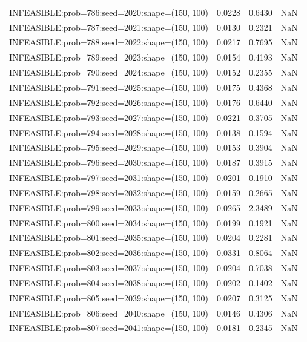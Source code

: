 \begin{longtable}{lccc}
INFEASIBLE:prob=786:seed=2020:shape=(150, 100) &   0.0228 &  0.6430 &    NaN \\
INFEASIBLE:prob=787:seed=2021:shape=(150, 100) &   0.0130 &  0.2321 &    NaN \\
INFEASIBLE:prob=788:seed=2022:shape=(150, 100) &   0.0217 &  0.7695 &    NaN \\
INFEASIBLE:prob=789:seed=2023:shape=(150, 100) &   0.0154 &  0.4193 &    NaN \\
INFEASIBLE:prob=790:seed=2024:shape=(150, 100) &   0.0152 &  0.2355 &    NaN \\
INFEASIBLE:prob=791:seed=2025:shape=(150, 100) &   0.0175 &  0.4368 &    NaN \\
INFEASIBLE:prob=792:seed=2026:shape=(150, 100) &   0.0176 &  0.6440 &    NaN \\
INFEASIBLE:prob=793:seed=2027:shape=(150, 100) &   0.0221 &  0.3705 &    NaN \\
INFEASIBLE:prob=794:seed=2028:shape=(150, 100) &   0.0138 &  0.1594 &    NaN \\
INFEASIBLE:prob=795:seed=2029:shape=(150, 100) &   0.0153 &  0.3904 &    NaN \\
INFEASIBLE:prob=796:seed=2030:shape=(150, 100) &   0.0187 &  0.3915 &    NaN \\
INFEASIBLE:prob=797:seed=2031:shape=(150, 100) &   0.0201 &  0.1910 &    NaN \\
INFEASIBLE:prob=798:seed=2032:shape=(150, 100) &   0.0159 &  0.2665 &    NaN \\
INFEASIBLE:prob=799:seed=2033:shape=(150, 100) &   0.0265 &  2.3489 &    NaN \\
INFEASIBLE:prob=800:seed=2034:shape=(150, 100) &   0.0199 &  0.1921 &    NaN \\
INFEASIBLE:prob=801:seed=2035:shape=(150, 100) &   0.0204 &  0.2281 &    NaN \\
INFEASIBLE:prob=802:seed=2036:shape=(150, 100) &   0.0331 &  0.8064 &    NaN \\
INFEASIBLE:prob=803:seed=2037:shape=(150, 100) &   0.0204 &  0.7038 &    NaN \\
INFEASIBLE:prob=804:seed=2038:shape=(150, 100) &   0.0202 &  0.1402 &    NaN \\
INFEASIBLE:prob=805:seed=2039:shape=(150, 100) &   0.0207 &  0.3125 &    NaN \\
INFEASIBLE:prob=806:seed=2040:shape=(150, 100) &   0.0146 &  0.4306 &    NaN \\
INFEASIBLE:prob=807:seed=2041:shape=(150, 100) &   0.0181 &  0.2345 &    NaN \\

\end{longtable}
